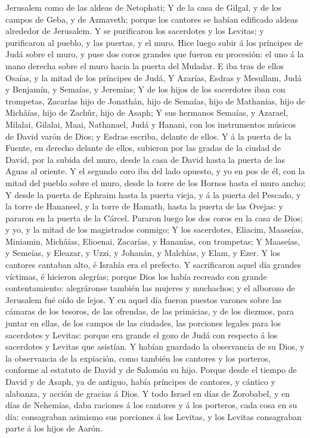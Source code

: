 Jerusalem como de las aldeas de Netophati;  Y de la casa de
Gilgal, y de los campos de Geba, y de Azmaveth; porque los cantores se
habían edificado aldeas alrededor de Jerusalem.  Y se
purificaron los sacerdotes y los Levitas; y purificaron al pueblo, y las
puertas, y el muro.  Hice luego subir á los príncipes de
Judá sobre el muro, y puse dos coros grandes que fueron en procesión: el
uno á la mano derecha sobre el muro hacia la puerta del Muladar.
 E iba tras de ellos Osaías, y la mitad de los príncipes de
Judá,  Y Azarías, Esdras y Mesullam,  Judá y
Benjamín, y Semaías, y Jeremías;  Y de los hijos de los
sacerdotes iban con trompetas, Zacarías hijo de Jonathán, hijo de
Semaías, hijo de Mathanías, hijo de Michâías, hijo de Zachûr, hijo de
Asaph;  Y sus hermanos Semaías, y Azarael, Milalai,
Gilalai, Maai, Nathanael, Judá y Hanani, con los instrumentos músicos de
David varón de Dios; y Esdras escriba, delante de ellos.  Y
á la puerta de la Fuente, en derecho delante de ellos, subieron por las
gradas de la ciudad de David, por la subida del muro, desde la casa de
David hasta la puerta de las Aguas al oriente.  Y el
segundo coro iba del lado opuesto, y yo en pos de él, con la mitad del
pueblo sobre el muro, desde la torre de los Hornos hasta el muro ancho;
 Y desde la puerta de Ephraim hasta la puerta vieja, y á la
puerta del Pescado, y la torre de Hananeel, y la torre de Hamath, hasta
la puerta de las Ovejas: y pararon en la puerta de la Cárcel.
 Pararon luego los dos coros en la casa de Dios; y yo, y la
mitad de los magistrados conmigo;  Y los sacerdotes,
Eliacim, Maaseías, Miniamin, Michâías, Elioenai, Zacarías, y Hananías,
con trompetas;  Y Maaseías, y Semeías, y Eleazar, y Uzzi, y
Johanán, y Malchías, y Elam, y Ezer. Y los cantores cantaban alto, é
Israhía era el prefecto.  Y sacrificaron aquel día grandes
víctimas, é hicieron alegrías; porque Dios los había recreado con grande
contentamiento: alegráronse también las mujeres y muchachos; y el
alborozo de Jerusalem fué oído de lejos.  Y en aquel día
fueron puestos varones sobre las cámaras de los tesoros, de las
ofrendas, de las primicias, y de los diezmos, para juntar en ellas, de
los campos de las ciudades, las porciones legales para los sacerdotes y
Levitas: porque era grande el gozo de Judá con respecto á los sacerdotes
y Levitas que asistían.  Y habían guardado la observancia
de su Dios, y la observancia de la expiación, como también los cantores
y los porteros, conforme al estatuto de David y de Salomón su hijo.
 Porque desde el tiempo de David y de Asaph, ya de antiguo,
había príncipes de cantores, y cántico y alabanza, y acción de gracias á
Dios.  Y todo Israel en días de Zorobabel, y en días de
Nehemías, daba raciones á los cantores y á los porteros, cada cosa en su
día: consagraban asimismo sus porciones á los Levitas, y los Levitas
consagraban parte á los hijos de Aarón.

